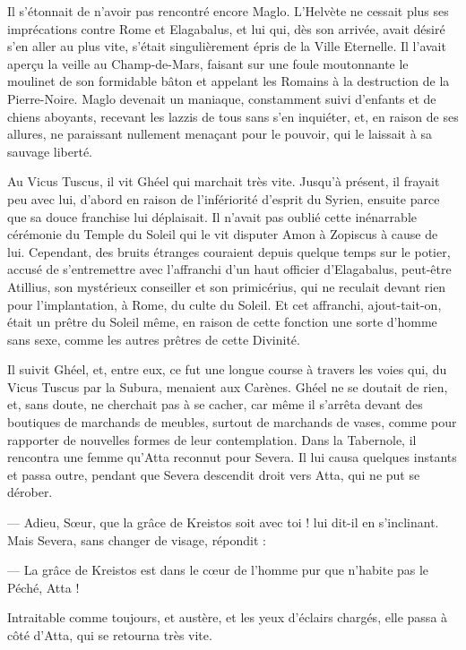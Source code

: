 \documentclass[a4paper, 11pt, oneside, polutonikogreek, french]{article}
\begin{document}
Il s'étonnait de n'avoir pas rencontré encore Maglo. L'Helvète ne cessait plus ses imprécations contre Rome et Elagabalus, et lui qui, dès son arrivée, avait désiré s'en aller au plus vite, s'était singulièrement épris de la Ville Eternelle. Il l'avait aperçu la veille au Champ-de-Mars, faisant sur une foule moutonnante le moulinet de son formidable bâton et appelant les Romains à la destruction de la Pierre-Noire. Maglo devenait un maniaque, constamment suivi d'enfants et de chiens aboyants, recevant les lazzis de tous sans s'en inquiéter, et, en raison de ses allures, ne paraissant nullement menaçant pour le pouvoir, qui le laissait à sa sauvage liberté.

Au Vicus Tuscus, il vit Ghéel qui marchait très vite. Jusqu'à présent, il frayait peu avec lui, d'abord en raison de l'infériorité d'esprit du Syrien, ensuite parce que sa douce franchise lui déplaisait. Il n'avait pas oublié cette inénarrable cérémonie du Temple du Soleil qui le vit disputer Amon à Zopiscus à cause de lui. Cependant, des bruits étranges couraient depuis quelque temps sur le potier, accusé de s'entremettre avec l'affranchi d'un haut officier d'Elagabalus, peut-être Atillius, son mystérieux conseiller et son primicérius, qui ne reculait devant rien pour l'implantation, à Rome, du culte du Soleil. Et cet affranchi, ajout-tait-on, était un prêtre du Soleil même, en raison de cette fonction une sorte d'homme sans sexe, comme les autres prêtres de cette Divinité.

Il suivit Ghéel, et, entre eux, ce fut une longue course à travers les voies qui, du Vicus Tuscus par la Subura, menaient aux Carènes. Ghéel ne se doutait de rien, et, sans doute, ne cherchait pas à se cacher, car même il s'arrêta devant des boutiques de marchands de meubles, surtout de marchands de vases, comme pour rapporter de nouvelles formes de leur contemplation. Dans la Tabernole, il rencontra une femme qu'Atta reconnut pour Severa. Il lui causa quelques instants et passa outre, pendant que Severa descendit droit vers Atta, qui ne put se dérober.

--- Adieu, Sœur, que la grâce de Kreistos soit avec toi ! lui dit-il en s'inclinant. Mais Severa, sans changer de visage, répondit :

--- La grâce de Kreistos est dans le cœur de l'homme pur que n'habite pas le Péché, Atta !

Intraitable comme toujours, et austère, et les yeux d'éclairs chargés, elle passa à côté d'Atta, qui se retourna très vite.
\end{document}
